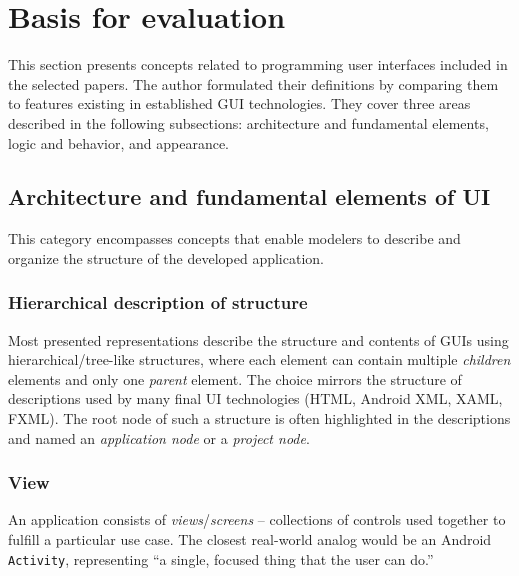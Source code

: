 \section{Basis for evaluation}\label{sec:basis-for-evaluation}

This section presents concepts related to programming user interfaces included in the selected papers.
The author formulated their definitions by comparing them to features existing in established GUI technologies.
They cover three areas described in the following subsections: architecture and fundamental elements, logic and behavior, and appearance.

\subsection{Architecture and fundamental elements of UI}\label{subsec:architecture-and-basic-elements-of-ui}
This category encompasses concepts that enable modelers to describe and organize the structure of the developed application.

\subsubsection{Hierarchical description of structure}
Most presented representations describe the structure and contents of GUIs using hierarchical/tree-like structures, where each element can contain multiple \emph{children} elements and only one \emph{parent} element.
The choice mirrors the structure of descriptions used by many final UI technologies (HTML, Android XML, XAML, FXML).
The root node of such a structure is often highlighted in the descriptions and named an \emph{application node} or a \emph{project node}.

\subsubsection{View}
An application consists of \emph{views}/\emph{screens} -- collections of controls used together to fulfill a particular use case.
The closest real-world analog would be an Android \texttt{Activity}, representing \enquote{a single, focused thing that the user can do.}

